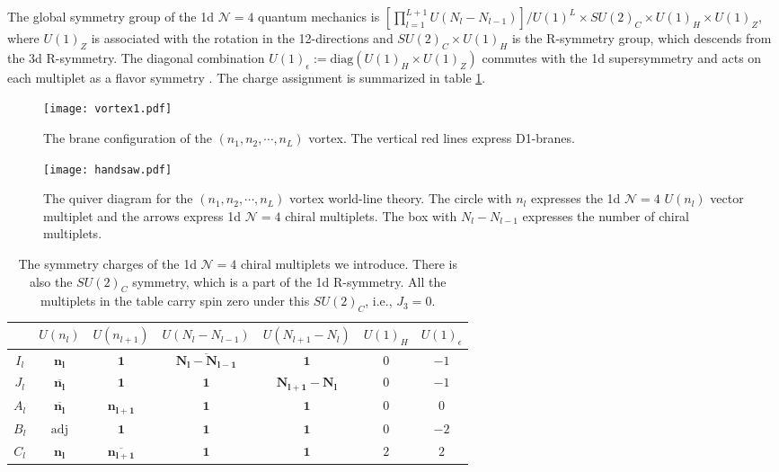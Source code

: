\documentclass[a4paper,11pt]{article}
\begin{document}
The global symmetry group of the 1d $\mathcal{N}=4$ quantum mechanics is $[\prod_{l=1}^{L+1} U(N_{l}-N_{l-1})]/U(1)^L \times SU(2)_C \times U(1)_H  \times U(1)_Z$, where $U(1)_{Z}$ is associated with the rotation in the 12-directions and $SU(2)_C \times U(1)_H$ is the R-symmetry group, which descends from the 3d R-symmetry. The diagonal combination $U(1)_{\epsilon}:=\mathrm{diag}(U(1)_H \times U(1)_Z)$ commutes with the 1d supersymmetry and acts on each multiplet as a flavor symmetry \cite{Bullimore:2016hdc}. The charge assignment is summarized in table \ref{tab:1dN4}.
\begin{figure}[tbp]
\begin{center}
\texttt{[image: vortex1.pdf]}
\end{center}
\vspace{-0.5cm}
\caption{The brane configuration of the $(n_1,n_2, \cdots ,n_L)$ vortex. The  vertical red lines express D1-branes.}
\label{fig:vortex1}
\end{figure}
%
\begin{figure}[tbp]
\begin{center}
\texttt{[image: handsaw.pdf]}
\end{center}
\vspace{-0.5cm}
\caption{The quiver diagram for the $(n_1,n_2, \cdots, n_L)$ vortex world-line theory. The circle with $n_l$ expresses the 1d $\mathcal{N}=4$ $U(n_l)$ vector multiplet and the arrows express 1d $\mathcal{N}=4$ chiral multiplets. The box with $N_l-N_{l-1}$ expresses the number of chiral multiplets.}
\label{fig:handsaw}
\end{figure}
%
\begin{table}[tbp]
\centering
\begin{tabular}{|c|cccccc|}
\hline
 & $U(n_l)$ & $U(n_{l+1})$ & $U(N_{l}-N_{l-1})$ & $U(N_{l+1}-N_{l})$ & $U(1)_H$ & $U(1)_{\epsilon}$ \\
\hline
$I_l$ & $\mathbf{n_l}$ & $\mathbf 1$ & $\mathbf{\overline{N_{l}-N_{l-1}}}$ & $\mathbf 1$  & $0$ & $-1$ \\
$J_l$ & $\mathbf{\overline{n_l}}$ & $\mathbf{1}$ & $\mathbf{1}$ & $\mathbf{N_{l+1}-N_{l}}$ & $0$ & $-1$ \\
$A_l$ & $\mathbf{\overline{n_l}}$ & $\mathbf{n_{l+1}}$ & $\mathbf{1}$ & $\mathbf 1$ & $0$ & $0$ \\
$B_l$ & $\mathbf{\mathrm{adj}}$ & $\mathbf 1$ & $\mathbf{1}$ & $\mathbf 1$ & $0$ & $-2$ \\
$C_l$ & $\mathbf{n_{l}}$ & $\mathbf{\overline{n_{l+1}}}$ & $\mathbf 1$ & $\mathbf 1$ & $2$ & $2$ \\
\hline
\end{tabular}
\caption{\label{tab:1dN4} The symmetry charges of the 1d $\mathcal{N}=4$ chiral multiplets we introduce. There is also the $SU(2)_C$ symmetry, which is a part of the 1d R-symmetry. All the multiplets in the table carry spin zero under this $SU(2)_C$, i.e., $J_3 = 0$.}
\end{table}
\end{document}
